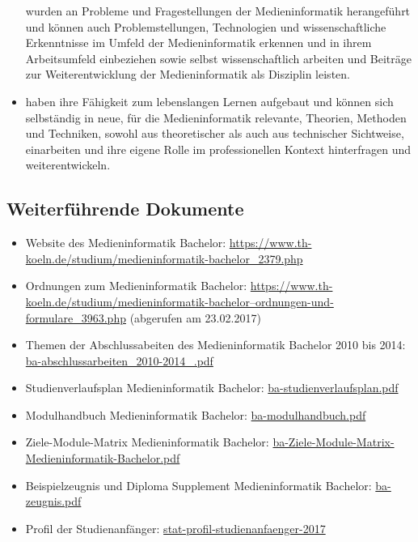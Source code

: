 \begin{itemize}
  wurden an Probleme und Fragestellungen der Medieninformatik
  herangeführt und können auch Problemstellungen, Technologien und
  wissenschaftliche Erkenntnisse im Umfeld der Medieninformatik erkennen
  und in ihrem Arbeitsumfeld einbeziehen sowie selbst wissenschaftlich
  arbeiten und Beiträge zur Weiterentwicklung der Medieninformatik als
  Disziplin leisten.
\item
  haben ihre Fähigkeit zum lebenslangen Lernen aufgebaut und können sich
  selbständig in neue, für die Medieninformatik relevante, Theorien,
  Methoden und Techniken, sowohl aus theoretischer als auch aus
  technischer Sichtweise, einarbeiten und ihre eigene Rolle im
  professionellen Kontext hinterfragen und weiterentwickeln.
\end{itemize}

\subsection{Weiterführende
Dokumente}\label{weiterfuxfchrende-dokumente}

\begin{itemize}
\tightlist
\item
  Website des Medieninformatik Bachelor:
  \url{https://www.th-koeln.de/studium/medieninformatik-bachelor\_2379.php}
\item
  Ordnungen zum Medieninformatik Bachelor:
  \href{https://www.th-koeln.de/studium/medieninformatik-bachelor--ordnungen-und-formulare_3963.php}{https://www.th-koeln.de/studium/medieninformatik-bachelor--ordnungen-und-formulare\_3963.php}
  (abgerufen am 23.02.2017)
\item
  Themen der Abschlussabeiten des Medieninformatik Bachelor 2010 bis
  2014:
  \href{https://th-koeln.github.io/mi-2017/anhaenge/ba-abschlussarbeiten_2010-2014_.pdf}{ba-abschlussarbeiten\_2010-2014\_.pdf}
\item
  Studienverlaufsplan Medieninformatik Bachelor:
  \href{https://th-koeln.github.io/mi-2017/anhaenge/ba-studienverlaufsplan.pdf}{ba-studienverlaufsplan.pdf}
\item
  Modulhandbuch Medieninformatik Bachelor:
  \href{https://th-koeln.github.io/mi-2017/anhaenge/ba-modulhandbuch.pdf}{ba-modulhandbuch.pdf}
\item
  Ziele-Module-Matrix Medieninformatik Bachelor:
  \href{https://th-koeln.github.io/mi-2017/anhaenge/ba-Ziele-Module-Matrix-Medieninformatik-Bachelor.pdf}{ba-Ziele-Module-Matrix-Medieninformatik-Bachelor.pdf}
\item
  Beispielzeugnis und Diploma Supplement Medieninformatik Bachelor:
  \href{https://th-koeln.github.io/mi-2017/anhaenge/ba-zeugnis.pdf}{ba-zeugnis.pdf}
\item
  Profil der Studienanfänger:
  \href{https://th-koeln.github.io/mi-2017/anhaenge/stat-profil-studienanfaenger-2017}{stat-profil-studienanfaenger-2017}
\end{itemize}

